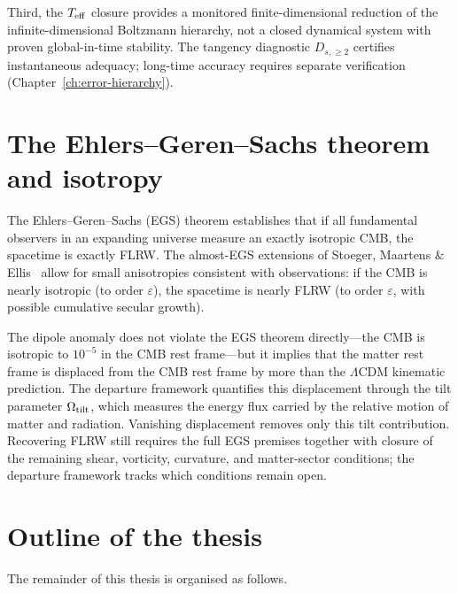 Third, the $T_{\mathrm{eff}}$ closure provides a monitored
finite-dimensional reduction of the infinite-dimensional
Boltzmann hierarchy, not a closed dynamical system with
proven global-in-time stability.  The tangency diagnostic
$D_{s,\geq 2}$ certifies instantaneous adequacy;
long-time accuracy requires separate verification
(Chapter~\ref{ch:error-hierarchy}).



\section{The Ehlers--Geren--Sachs theorem and isotropy}
\label{sec:intro-EGS}

The Ehlers--Geren--Sachs (EGS) theorem establishes that if
all fundamental observers in an expanding universe measure
an exactly isotropic CMB, the spacetime is exactly FLRW.
The almost-EGS extensions of Stoeger, Maartens \&
Ellis~\cite{StoegerME1995} allow for small anisotropies
consistent with observations: if the CMB is nearly isotropic
(to order $\varepsilon$), the spacetime is nearly FLRW (to
order $\varepsilon$, with possible cumulative secular
growth).

The dipole anomaly does not violate the EGS theorem
directly---the CMB is isotropic to $10^{-5}$ in the CMB rest
frame---but it implies that the matter rest frame is
displaced from the CMB rest frame by more than the
$\Lambda$CDM kinematic prediction.  The departure framework
quantifies this displacement through the tilt parameter
$\Omega_{\mathrm{tilt}}$, which measures the energy flux carried by the
relative motion of matter and radiation.  Vanishing displacement
removes only this tilt contribution.  Recovering FLRW still
requires the full EGS premises together with closure of the
remaining shear, vorticity, curvature, and matter-sector
conditions; the departure framework tracks which conditions
remain open.



\section{Outline of the thesis}
\label{sec:outline}

The remainder of this thesis is organised as follows.

